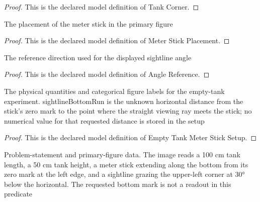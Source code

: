 \begin{proof}
  This is the declared model definition of Tank Corner.
\end{proof}
\begin{definition}
  \label{def:physics:phyx-mini-0070:phyxminiproblems-problemphyxmini0070-meterstickplacement}
  The placement of the meter stick in the primary figure
\end{definition}
\begin{proof}
  This is the declared model definition of Meter Stick Placement.
\end{proof}
\begin{definition}
  \label{def:physics:phyx-mini-0070:phyxminiproblems-problemphyxmini0070-anglereference}
  The reference direction used for the displayed sightline angle
\end{definition}
\begin{proof}
  This is the declared model definition of Angle Reference.
\end{proof}
\begin{definition}
  \label{def:physics:phyx-mini-0070:phyxminiproblems-problemphyxmini0070-emptytankmetersticksetup}
  The physical quantities and categorical figure labels for the empty-tank experiment. sightlineBottomRun is the unknown horizontal distance from the stick's zero mark to the point where the straight viewing ray meets the stick; no numerical value for that requested distance is stored in the setup
\end{definition}
\begin{proof}
  This is the declared model definition of Empty Tank Meter Stick Setup.
\end{proof}
\begin{definition}
  \label{def:physics:phyx-mini-0070:phyxminiproblems-problemphyxmini0070-matchesproblemandprimaryfigure}
  Problem-statement and primary-figure data. The image reads a 100 cm tank length, a 50 cm tank height, a meter stick extending along the bottom from its zero mark at the left edge, and a sightline grazing the upper-left corner at 30° below the horizontal. The requested bottom mark is not a readout in this predicate
\end{definition}

